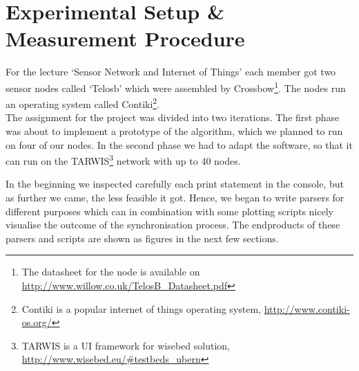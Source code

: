 \documentclass{llncs}
\begin{document}
	\section{Experimental Setup \& Measurement Procedure}
	For the lecture `Sensor Network and Internet of Things' each member got two sensor nodes called `Telosb' which were assembled by Crossbow\footnote{The datasheet for the node is available on \url{http://www.willow.co.uk/TelosB_Datasheet.pdf}}. The nodes run an operating system called Contiki\footnote{Contiki is a popular internet of things operating system, \url{http://www.contiki-os.org/}}.\\
	The assignment for the project was divided into two iterations. The first phase was about to implement a prototype of the algorithm, which we planned to run on four of our nodes. In the second phase we had to adapt the software, so that it can run on the TARWIS\footnote{TARWIS is a UI framework for wisebed solution, \url{http://www.wisebed.eu/\#testbeds_ubern}} network with up to 40 nodes.
	
	
	
	\noindent In the beginning we inspected carefully each print statement in the console, but as further we came, the less feasible it got. Hence, we began to write parsers for different purposes which can in combination with some plotting scripts nicely visualise the outcome of the synchronisation process. The endproducts of these parsers and scripts are shown as figures in the next few sections.
	
\end{document}
